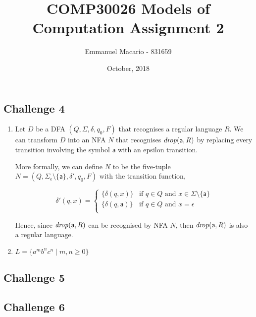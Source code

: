 \documentclass[12pt]{article}
\author{Emmanuel Macario - 831659}
\title{COMP30026 Models of Computation Assignment 2}
\date{October, 2018}
\newcommand{\id}[1]{\mbox{\textit{#1}}}
\newcommand{\ma}{\mathsf{a}}
\begin{document}
\maketitle

\subsection*{Challenge 4}

\begin{enumerate}
\item
Let $D$ be a DFA $(Q,\Sigma,\delta,q_0,F)$ that recognises a regular language $R$. We can transform 
$D$ into an NFA $N$ that recognises $\id{drop}(\ma,R)$ by replacing every transition involving the symbol
$\ma$ with an epsilon transition.

\bigskip
\noindent
More formally, we can define $N$ to be the five-tuple $N=(Q,\Sigma_\epsilon \setminus \{\ma\},\delta',q_0,F)$
with the transition function,

\[
  \delta'(q, x) =
  \begin{cases}
  	\{\delta (q, x)\}     & \text{if $q \in Q$ and $x \in \Sigma \setminus \{\ma\}$} \\
      \{\delta (q, \ma)\} & \text{if $q \in Q$ and $x = \epsilon$} \\
  \end{cases}
\]

\bigskip
\noindent
Hence, since $\id{drop}(\ma,R)$ can be recognised by NFA $N$, then $\id{drop}(\ma,R)$ is also a regular language.

\item $L=\{a^m b^n c^n \mid m, n \geq 0\}$

\end{enumerate}
\subsection*{Challenge 5}

\subsection*{Challenge 6}
\end{document}
